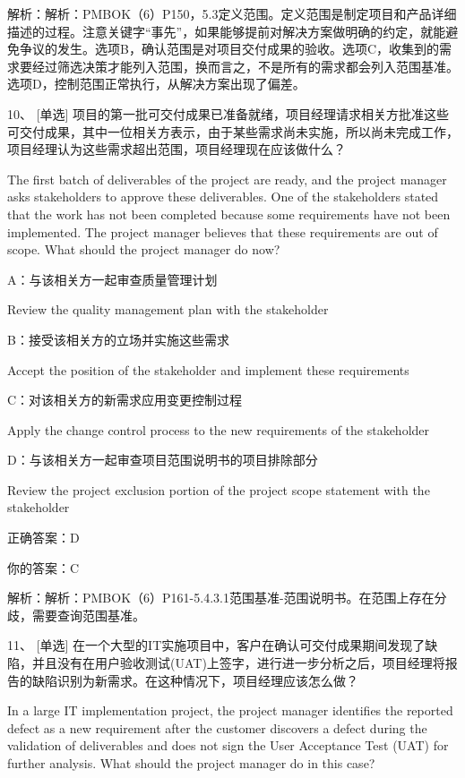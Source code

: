解析：解析：PMBOK（6）P150，5.3定义范围。定义范围是制定项目和产品详细描述的过程。注意关键字“事先”，如果能够提前对解决方案做明确的约定，就能避免争议的发生。选项B，确认范围是对项目交付成果的验收。选项C，收集到的需求要经过筛选决策才能列入范围，换而言之，不是所有的需求都会列入范围基准。选项D，控制范围正常执行，从解决方案出现了偏差。


10、 [单选] 项目的第一批可交付成果已准备就绪，项目经理请求相关方批准这些可交付成果，其中一位相关方表示，由于某些需求尚未实施，所以尚未完成工作，项目经理认为这些需求超出范围，项目经理现在应该做什么？

The first batch of deliverables of the project are ready, and the project manager asks stakeholders to approve these deliverables. One of the stakeholders stated that the work has not been completed because some requirements have not been implemented. The project manager believes that these requirements are out of scope. What should the project manager do now?

A：与该相关方一起审查质量管理计划

Review the quality management plan with the stakeholder

B：接受该相关方的立场并实施这些需求

Accept the position of the stakeholder and implement these requirements

C：对该相关方的新需求应用变更控制过程

Apply the change control process to the new requirements of the stakeholder

D：与该相关方一起审查项目范围说明书的项目排除部分

Review the project exclusion portion of the project scope statement with the stakeholder

正确答案：D

你的答案：C

解析：解析：PMBOK（6）P161-5.4.3.1范围基准-范围说明书。在范围上存在分歧，需要查询范围基准。



11、 [单选] 在一个大型的IT实施项目中，客户在确认可交付成果期间发现了缺陷，并且没有在用户验收测试(UAT)上签字，进行进一步分析之后，项目经理将报告的缺陷识别为新需求。在这种情况下，项目经理应该怎么做？

In a large IT implementation project, the project manager identifies the reported defect as a new requirement after the customer discovers a defect during the validation of deliverables and does not sign the User Acceptance Test (UAT) for further analysis. What should the project manager do in this case?

